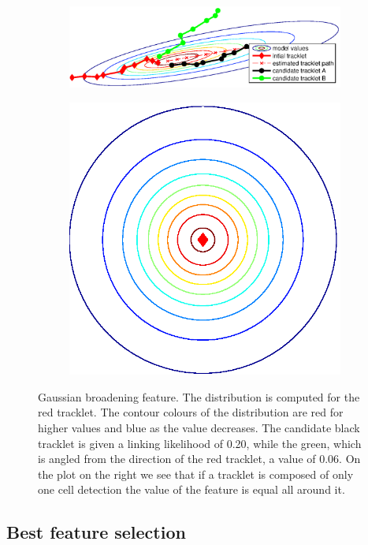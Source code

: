 			\begin{figure}[h]
				\begin{subfigure}{.78\textwidth}
				  \includegraphics[width=\textwidth]{images/fig_gaussianbroadening1}
				\end{subfigure}%
				\hfill
				\begin{subfigure}{.2\textwidth}
				  \includegraphics[width=\textwidth]{images/fig_gaussianbroadening2}
				\end{subfigure}
				\caption{Gaussian broadening feature. The distribution is computed for the red tracklet. The contour colours of the distribution are red for higher values and blue as the value decreases. The candidate black tracklet is given a linking likelihood of 0.20, while the green, which is angled from the direction of the red tracklet, a value of 0.06. On the plot on the right we see that if a tracklet is composed of only one cell detection the value of the feature is equal all around it.}
				\label{fig:gaussianbroadening}
			\end{figure}
			
  		\subsection{Best feature selection }
  			\label{sec:linkerbestfeatures}
	    	\notyetimplemented{}	    	
